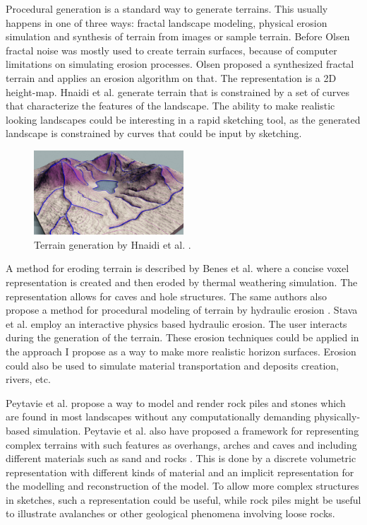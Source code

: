 \documentclass[a4paper,12pt]{report}
\begin{document}
 Procedural generation is a standard way to generate terrains. This usually happens in one of three ways: fractal landscape modeling, physical erosion simulation and synthesis of terrain from images or sample terrain. Before Olsen \cite{olsen2004realtime} fractal noise was mostly used to create terrain surfaces, because of computer limitations on simulating erosion processes. Olsen proposed a synthesized fractal terrain and applies an erosion algorithm on that. The representation is a 2D height-map. Hnaidi et al. \cite{hnaidi2010feature} generate terrain that is constrained by a set of curves that characterize the features of the landscape. The ability to make realistic looking landscapes could be interesting in a rapid sketching tool, as the generated landscape is constrained by curves that could be input by sketching.
 
 
\begin{figure}
 \centering
 \includegraphics[width=0.5\textwidth]{thesis/related/hnaidi.png}
 \caption{Terrain generation by Hnaidi et al. \cite{hnaidi2010feature}. }
 \label{fig:hnaidi}
\end{figure}

 
 A method for eroding terrain is described by Benes et al. \cite{benes2001layered} where a concise voxel representation is created and then eroded by thermal weathering simulation. The representation allows for caves and hole structures. The same authors also propose a method for procedural modeling of terrain by hydraulic erosion \cite{benevs2002visual}. Stava et al. \cite{vst2008interactive} employ an interactive physics based hydraulic erosion. The user interacts during the generation of the terrain. These erosion techniques could be applied in the approach I propose as a way to make more realistic horizon surfaces. Erosion could also be used to simulate material transportation and deposits creation, rivers, etc.
 
 Peytavie et al. \cite{peytavie2009procedural} propose a way to model and render rock piles and stones which are found in most landscapes without any computationally demanding physically-based simulation. Peytavie et al. also have proposed a framework for representing complex terrains with such features as overhangs, arches and caves and including different materials such as sand and rocks \cite{peytavie2009arches}. This is done by a discrete volumetric representation with different kinds of material and an implicit representation for the modelling and reconstruction of the model. To allow more complex structures in sketches, such a representation could be useful, while rock piles might be useful to illustrate avalanches or other geological phenomena involving loose rocks.
\end{document}
